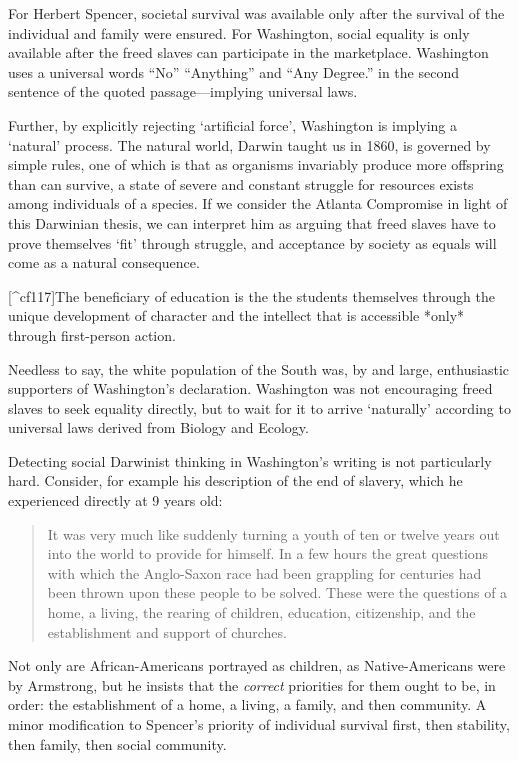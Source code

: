 For Herbert Spencer, societal survival was available only after the survival of the individual and family were ensured. For Washington, social equality is only available after the freed slaves can participate in the marketplace. Washington uses a universal words ``No'' ``Anything'' and ``Any Degree.'' in the second sentence of the quoted passage---implying universal laws.

Further, by explicitly rejecting `artificial force', Washington is implying a `natural' process. The natural world, Darwin taught us in 1860, is governed by simple rules, one of which is that as organisms invariably produce more offspring than can survive, a state of severe and constant struggle for resources exists among individuals of a species. If we consider the Atlanta Compromise in light of this Darwinian thesis, we can interpret him as arguing that freed slaves have to prove themselves `fit' through struggle, and acceptance by society as equals will come as a natural consequence.\begin{objects}
\label{washingtonobjects}[^cf117]The beneficiary of education is the the students themselves through the unique development of character and the intellect that is accessible *only* through first-person action.
\end{objects}


Needless to say, the white population of the South was, by and large, enthusiastic supporters of Washington's declaration. Washington was not encouraging freed slaves to seek equality directly, but to wait for it to arrive `naturally' according to universal laws derived from Biology and Ecology.

Detecting social Darwinist thinking in Washington's writing is not particularly hard. Consider, for example his description of the end of slavery, which he experienced directly at 9 years old:

\begin{quote}

It was very much like suddenly turning a youth of ten or twelve years out into the world to provide for himself. In a few hours the great questions with which the Anglo-Saxon race had been grappling for centuries had been thrown upon these people to be solved. These were the questions of a home, a living, the rearing of children, education, citizenship, and the establishment and support of churches. ~\citep[p. 12]{Washington:1952uf}
\end{quote}

Not only are African-Americans portrayed as children, as Native-Americans were by Armstrong, but he insists that the \emph{correct} priorities for them ought to be, in order: the establishment of a home, a living, a family, and then community. A minor modification to Spencer's priority of individual survival first, then stability, then family, then social community.

